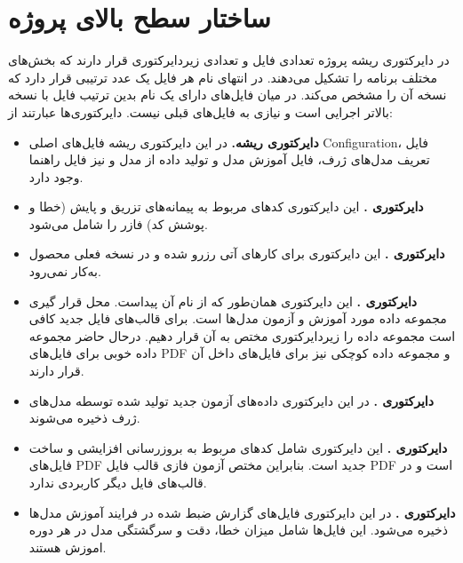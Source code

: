 \section{ساختار سطح بالای پروژه}
در دایرکتوری ریشه پروژه تعدادی فایل و تعدادی زیردایرکتوری قرار دارند که بخش‌های مختلف برنامه را تشکیل می‌دهند. در انتهای نام هر فایل یک عدد ترتیبی قرار دارد که نسخه‌ آن را مشخص می‌کند. در میان فایل‌های دارای یک نام بدین ترتیب فایل با نسخه بالاتر اجرایی است و نیازی به فایل‌های قبلی نیست. دایرکتوری‌ها عبارتند از:
  
\begin{itemize}

\item{
\textbf{دایرکتوری ریشه.}
در این دایرکتوری ریشه فایل‌های اصلی \gls{Configuration}، فایل تعریف مدل‌های ژرف، فایل آموزش مدل و تولید داده از مدل و نیز فایل راهنما وجود دارد. 
}

\item{
	\textbf{دایرکتوری .}
	این دایرکتوری کدهای مربوط به پیمانه‌های تزریق و پایش (خطا و پوشش کد) فازر را شامل می‌شود.
}


\item{
	\textbf{دایرکتوری .}
	این دایرکتوری برای کارهای آتی رزرو شده و در نسخه فعلی محصول به‌کار نمی‌رود.
}

\item{
	\textbf{دایرکتوری .}
	این دایرکتوری همان‌طور که از نام آن پیداست. محل قرار گیری مجموعه داده مورد آموزش  و آزمون مدل‌ها است. برای قالب‌های فایل جدید کافی است مجموعه داده را زیردایرکتوری مختص به آن قرار دهیم. درحال حاضر مجموعه داده خوبی برای فایل‌های \gls{PDF} و مجموعه داده کوچکی نیز برای فایل‌های  داخل آن قرار دارند.
}

\item{
	\textbf{دایرکتوری .}
	در این دایرکتوری داده‌های آزمون جدید تولید شده توسطه مدل‌های ژرف ذخیره می‌شوند.
}

\item{
	\textbf{دایرکتوری .}
	این دایرکتوری شامل کدهای مربوط به بروزرسانی افزایشی و ساخت فایل‌های \gls{PDF} جدید است. بنابراین مختص آزمون فازی قالب فایل \gls{PDF} است و در قالب‌های فایل دیگر کاربردی ندارد. 
}

\item{
	\textbf{دایرکتوری .}
	در این دایرکتوری فایل‌های گزارش ضبط شده در فرایند آموزش مدل‌ها ذخیره می‌شود. این فایل‌ها شامل میزان خطا، دقت و سرگشتگی مدل در هر دوره اموزش هستند.
}


\end{itemize}

